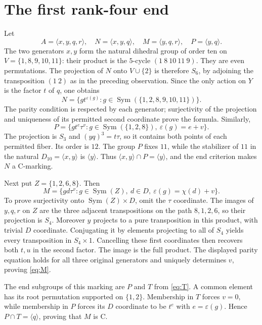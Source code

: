 \documentclass[11pt,a4paper]{article}
\newcommand{\Sym}{\operatorname{Sym}}\newcommand{\Alt}{\operatorname{Alt}}
\newcommand{\gen}[1]{\langle#1\rangle}\newcommand{\eps}{\varepsilon}
\begin{document}
\section{The first rank-four end}
Let
\[
 A=\gen{x,y,q,r},\quad N=\gen{x,y,q},\quad M=\gen{y,q,r},
 \quad P=\gen{y,q}.
\]
The two generators $x,y$ form the natural dihedral group of order ten on
$V=\{1,8,9,10,11\}$: their product is the $5$-cycle
$(1\ 8\ 10\ 11\ 9)$. They are even permutations.
The projection of $N$ onto $V\cup\{2\}$ is therefore $S_6$, by adjoining
the transposition $(1\ 2)$ as in the preceding observation. Since the
only action on $Y$ is the factor $t$ of $q$, one obtains
\begin{equation}\label{eq:N}
 N=\{g t^{\eps(g)}:g\in\Sym(\{1,2,8,9,10,11\})\}.
\end{equation}
The parity condition is respected by each generator; surjectivity of the
projection and uniqueness of its permitted second coordinate prove the formula.
Similarly,
\begin{equation}\label{eq:P}
 P=\{g t^e\tau^v:g\in\Sym(\{1,2,8\}),\ \eps(g)=e+v\}.
\end{equation}
The projection is $S_3$ and $(yq)^3=t\tau$, so it contains both points
of each permitted fiber. Its order is $12$.
The group $P$ fixes $11$, while the stabilizer of $11$ in the natural
$D_{10}=\gen{x,y}$ is $\gen{y}$. Thus
$\gen{x,y}\cap P=\gen{y}$, and the end criterion makes $N$ a C-marking.

Next put $Z=\{1,2,6,8\}$. Then
\begin{equation}\label{eq:M}
 M=\{g d\tau^v:g\in\Sym(Z),\ d\in D,\ \eps(g)=\chi(d)+v\}.
\end{equation}
To prove surjectivity onto $\Sym(Z)\times D$, omit the $\tau$ coordinate.
The images of $y,q,r$ on $Z$ are the three adjacent transpositions on
the path $8,1,2,6$, so their projection is $S_4$. Moreover $y$ projects
to a pure transposition in this product, with trivial $D$ coordinate.
Conjugating it by elements projecting to all of $S_4$ yields every
transposition in $S_4\times1$. Cancelling these first coordinates then
recovers both $t,u$ in the second factor. The image is the full product.
The displayed parity equation holds for all three original generators
and uniquely determines $v$, proving \eqref{eq:M}.

The end subgroups of this marking are $P$ and $T$ from \eqref{eq:T}.
A common element has its root permutation supported on $\{1,2\}$.
Membership in $T$ forces $v=0$, while membership in $P$ forces its
$D$ coordinate to be $t^e$ with $e=\eps(g)$. Hence
$P\cap T=\gen{q}$, proving that $M$ is C.
\end{document}
